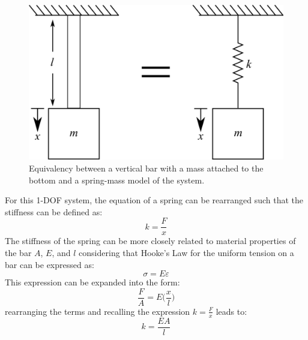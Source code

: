 \documentclass[12pt,letter]{article}
\begin{document}
			
			\begin{figure}[H]
				\centering
				\includegraphics[]{../figures/spring_and_bar_mass_vertical.png}
				\caption{Equivalency between a vertical bar with a mass attached to the bottom and a spring-mass model of the system.}
				\label{fig:spring_and_bar_mass_vertical}
			\end{figure}
			
			For this 1-DOF system, the equation of a spring can be rearranged such that the stiffness can be defined as:
			\begin{equation}
				k=\frac{F}{x}
			\end{equation}
			The stiffness of the spring can be more closely related to material properties of the bar $A$, $E$, and $l$ considering that Hooke's Law for the uniform tension on a bar can be expressed as:
			\begin{equation}
				\sigma = E \varepsilon
			\end{equation}			
			This expression can be expanded into the form:
			\begin{equation}
				\frac{F}{A} = E \Big( \frac{x}{l} \Big)
			\end{equation}					
			rearranging the terms and recalling the expression $k = \frac{F}{x}$ leads to:			
			\begin{equation}
				 k = \frac{EA}{l}
			\end{equation}				
		
\end{document}
